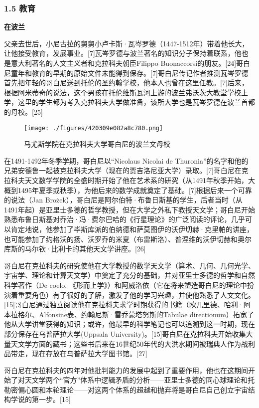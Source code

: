 \subsubsection{1.5 教育}
\textbf{在波兰}

父亲去世后，小尼古拉的舅舅小卢卡斯·瓦岑罗德（1447-1512年）带着他长大，让他接受教育，发展事业。[7]瓦岑罗德与波兰著名的知识分子保持着联系，他也是意大利著名的人文主义者和克拉科夫朝臣Filippo Buonaccorsi的朋友。[24]哥白尼童年和教育的早期的原始文件未能得到保存。[7]哥白尼传记作者推测瓦岑罗德首先把年轻的哥白尼送到托伦的圣约翰学校，他本人也曾在这里任教。[7]后来，根据阿米蒂奇的说法，这个男孩在托伦维斯瓦河上游的波兰弗沃茨大教堂学校上学，这里的学生都为考入克拉科夫大学做准备，该所大学也是瓦岑罗德在波兰首都的母校。[25]
\begin{figure}[ht]
\centering
\texttt{[image: ./figures/420309e082a8c780.png]}
\caption{马尤斯学院在克拉科夫大学哥白尼的波兰文母校} \label{fig_GBN_4}
\end{figure}
在1491-1492年冬季学期，哥白尼以“Nicolaus Nicolai de Thuronia”的名字和他的兄弟安德鲁一起被克拉科夫大学（现在的贾吉洛尼亚大学）录取。[7]哥白尼在克拉科夫天文数学学院的全盛时期开始了他在艺术系的研究（从1491年秋季开始，大概到1495年夏季或秋季），为他后来的数学成就奠定了基础。[7]根据后来一个可靠的说法（Jan Brożek），哥白尼是阿尔伯特·布鲁日斯基的学生，后者当时（从1491年起）是亚里士多德的哲学教授，但在大学之外私下教授天文学；哥白尼开始熟悉布鲁日斯基对乔治·冯·费尔巴哈的《行星理论》的广泛阅读的评论，几乎可以肯定地说，他参加了毕斯库派的伯纳德和萨莫图伊的沃伊切赫·克里帕的讲座，也可能参加了约格沃的扬、沃罗乔的米夏（布雷斯洛）、普涅维的沃伊切赫和奥尔库斯的马尔钦·比利卡的其他天文学讲座。[26]

哥白尼在克拉科夫的研究使他在大学教授的数学天文学（算术、几何、几何光学、宇宙学、理论和计算天文学）中奠定了充分的基础，并对亚里士多德的哲学和自然科学著作（De coelo, 《形而上学》）和阿威洛依（它在将来塑造哥白尼的理论中扮演着重要角色）有了很好的了解，激发了他的学习兴趣，并使他熟悉了人文文化。[15]哥白尼通过独立阅读他在克拉科夫求学时期获得的书籍（欧几里德、哈利·阿本拉格尔、Alfonsine表、约翰尼斯·雷乔蒙塔努斯的Tabulae directionum）拓宽了他从大学讲堂获得的知识；或许，他最早的科学笔记也可以追溯到这一时期，现在部分保存在乌普萨拉大学(Uppsala University)。[15]哥白尼在克拉科夫开始收集大量天文学方面的藏书；这些书后来在16世纪50年代的大洪水期间被瑞典人作为战利品带走，现在存放在乌普萨拉大学图书馆。[27]

哥白尼在克拉科夫的四年对他批判能力的发展中起到了重要作用，他也在这期间开始了对天文学两个“官方”体系中逻辑矛盾的分析——亚里士多德的同心球理论和托勒密偏心圆和本轮理论——对这两个体系的超越和抛弃将是哥白尼自己创立宇宙结构学说的第一步。[15]

